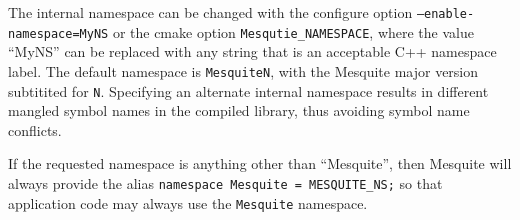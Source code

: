The internal namespace can be changed with the configure option \texttt{--enable-namespace=MyNS} or the cmake option \texttt{Mesqutie\_NAMESPACE}, where the value ``MyNS'' can be replaced with any string that is an acceptable C++ namespace label.  The default namespace is \texttt{MesquiteN}, with the Mesquite major version subtitited for \texttt{N}.  Specifying an alternate internal namespace results in different mangled symbol names in the compiled library, thus avoiding symbol name conflicts.

If the requested namespace is anything other than ``Mesquite'', then Mesquite will always provide the alias \texttt{namespace Mesquite = MESQUITE\_NS;} so that application code may always use the \texttt{Mesquite} namespace.


